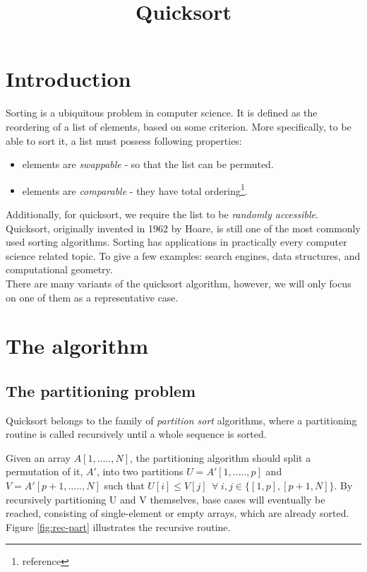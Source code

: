 \documentclass[]{finalproject}
\title{Quicksort}
\subtitle{}
\begin{document}
\maketitle

\section{Introduction} \label{introduction}

Sorting is a ubiquitous problem in computer science. It is defined as the reordering of a list of elements, based on some criterion.
More specifically, to be able to sort it, a list must possess following properties:

\begin{itemize}
\item elements are \textit{swappable} - so that the list can be permuted.
\item elements are \textit{comparable} - they have total ordering\footnote{reference}.
\end{itemize}

Additionally, for quicksort, we require the list to be \textit{randomly accessible}.\\
Quicksort, originally invented in 1962 by Hoare, is still one of the most commonly used sorting algorithms. Sorting has applications in practically every computer science related topic. To give a few examples: search engines, data structures, and computational geometry.\\
There are many variants of the quicksort algorithm, however, we will only focus on one of them as a representative case.  



\section{The algorithm}


\subsection{The partitioning problem}

Quicksort belongs to the family of \textit{partition sort} algorithms,
where a partitioning routine is called recursively until a whole sequence is sorted.

Given an array $A[1,.....,N]$, the partitioning algorithm should split a permutation
of it, $A'$, into two partitions $U=A'[1,.....,p]$ and $V=A'[p+1,.....,N]$ such that
$U[i] \leq V[j] \;\, \forall \; i,j \in \{[1,p] , [p+1,N]\}$. 
By recursively partitioning U and V themselves, base cases will eventually be reached,
consisting of single-element or empty arrays, which are already sorted.
Figure \ref{fig:rec-part} illustrates the recursive routine.
\end{document}
